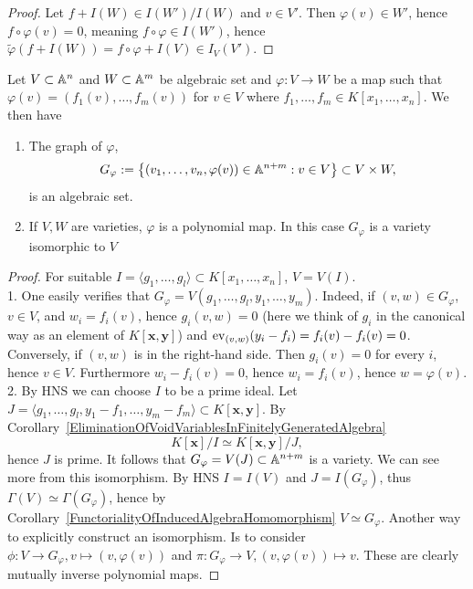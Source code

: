 \begin{proof}
    Let $f+I(W)\in I(W')/I(W)$ and $v\in V'$. Then $\varphi(v)\in W'$, hence $f\circ \varphi(v) = 0$, meaning $f\circ \varphi \in I(W')$, hence $\widetilde{\varphi}(f+I(W))=f\circ \varphi + I(V) \in I_V(V').$
\end{proof}
\begin{lemma}
    Let $V\subset \mathbb{A}^n$ and $W\subset \mathbb{A}^m$ be algebraic set and $\varphi: V\rightarrow W$ be a map such that $\varphi(v) = (f_1(v),\dots,f_m(v))$ for $v\in V$ where $f_1,\dots,f_m\in K[x_1,\dots,x_n]$. We then have 
    \begin{enumerate}
        \item The graph of $\varphi$,
        $$G_\varphi := \left\{ (v_1,\dots,v_n, \varphi(v)) \in \mathbb{A}^{n+m} : v\in V \right\}\subset V\times W,$$
        is an algebraic set.
        \item If $V,W$ are varieties, $\varphi$ is a polynomial map. In this case $G_\varphi$ is a variety isomorphic to $V$
    \end{enumerate}
\end{lemma}
\begin{proof}
    For suitable $I=\langle g_1,\dots,g_l\rangle \subset K[x_1,\dots,x_n]$, $V=V(I)$.\\
    1. One easily verifies that $G_\varphi = V(g_1,\dots,g_l,y_1,\dots,y_m)$. Indeed, if $(v,w)\in G_\varphi$, $v\in V$, and $w_i = f_i(v)$, hence $g_i(v,w)=0$ (here we think of $g_i$ in the canonical way as an element of $K[\mathbf{x},\mathbf{y}]$) and $\mathrm{ev}_{(v,w)}(y_i-f_i)=f_i(v)-f_i(v)=0$. Conversely, if $(v,w)$ is in the right-hand side. Then $g_i(v)=0$ for every $i$, hence $v\in V$. Furthermore $w_i-f_i(v)=0$, hence $w_i=f_i(v)$, hence $w = \varphi(v)$.\\
    2. By HNS we can choose $I$ to be a prime ideal. Let $J=\langle g_1,\dots,g_l,y_1-f_1,\dots,y_m-f_m\rangle \subset K[\mathbf{x},\mathbf{y}]$. By Corollary~\ref{EliminationOfVoidVariablesInFinitelyGeneratedAlgebra} $$K[\mathbf{x}]/I\simeq K[\mathbf{x},\mathbf{y}]/J,$$ 
    hence $J$ is prime. It follows that $G_\varphi = V(J)\subset \mathbb{A}^{n+m}$ is a variety. We can see more from this isomorphism. By HNS $I = I(V)$ and $J = I(G_\varphi)$, thus $\Gamma(V)\simeq \Gamma(G_\varphi)$, hence by Corollary~\ref{FunctorialityOfInducedAlgebraHomomorphism} $V\simeq G_\varphi$. Another way to explicitly construct an isomorphism. Is to consider $\phi: V \rightarrow G_\varphi, v\mapsto (v,\varphi(v))$ and $\pi : G_\varphi \rightarrow V, (v,\varphi(v))\mapsto v$. These are clearly mutually inverse polynomial maps.  
\end{proof}
